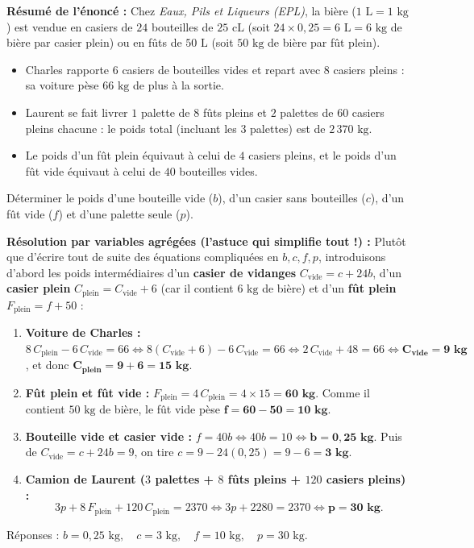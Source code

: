 \begin{exemple}
\textbf{Résumé de l'énoncé :} Chez \emph{Eaux, Pils et Liqueurs (EPL)}, la bière ($1\text{ L} = 1\text{ kg}$) est vendue en casiers de $24$ bouteilles de $25\text{ cL}$ (soit $24 \times 0,25 = 6\text{ L} = 6\text{ kg}$ de bière par casier plein) ou en fûts de $50\text{ L}$ (soit $50\text{ kg}$ de bière par fût plein).
\begin{itemize}
    \item Charles rapporte $6$ casiers de bouteilles vides et repart avec $8$ casiers pleins : sa voiture pèse $66\text{ kg}$ de plus à la sortie.
    \item Laurent se fait livrer $1$ palette de $8$ fûts pleins et $2$ palettes de $60$ casiers pleins chacune : le poids total (incluant les $3$ palettes) est de $2\,370\text{ kg}$.
    \item Le poids d'un fût plein équivaut à celui de $4$ casiers pleins, et le poids d'un fût vide équivaut à celui de $40$ bouteilles vides.
\end{itemize}
Déterminer le poids d'une bouteille vide ($b$), d'un casier sans bouteilles ($c$), d'un fût vide ($f$) et d'une palette seule ($p$).

\textbf{Résolution par variables agrégées (l'astuce qui simplifie tout !) :}
Plutôt que d'écrire tout de suite des équations compliquées en $b, c, f, p$, introduisons d'abord les poids intermédiaires d'un \textbf{casier de vidanges} $C_{\text{vide}} = c + 24b$, d'un \textbf{casier plein} $C_{\text{plein}} = C_{\text{vide}} + 6$ (car il contient $6\text{ kg}$ de bière) et d'un \textbf{fût plein} $F_{\text{plein}} = f + 50$ :
\begin{enumerate}
    \item \textbf{Voiture de Charles :} $8\,C_{\text{plein}} - 6\,C_{\text{vide}} = 66 \iff 8(C_{\text{vide}} + 6) - 6\,C_{\text{vide}} = 66 \iff 2\,C_{\text{vide}} + 48 = 66 \iff \mathbf{C_{\text{vide}} = 9\text{ kg}}$, et donc $\mathbf{C_{\text{plein}} = 9 + 6 = 15\text{ kg}}$.
    \item \textbf{Fût plein et fût vide :} $F_{\text{plein}} = 4\,C_{\text{plein}} = 4 \times 15 = \mathbf{60\text{ kg}}$. Comme il contient $50\text{ kg}$ de bière, le fût vide pèse $\mathbf{f = 60 - 50 = 10\text{ kg}}$.
    \item \textbf{Bouteille vide et casier vide :} $f = 40b \iff 40b = 10 \iff \mathbf{b = 0,25\text{ kg}}$. Puis de $C_{\text{vide}} = c + 24b = 9$, on tire $c = 9 - 24(0,25) = 9 - 6 = \mathbf{3\text{ kg}}$.
    \item \textbf{Camion de Laurent ($3$ palettes + $8$ fûts pleins + $120$ casiers pleins) :}
    \[
        3p + 8\,F_{\text{plein}} + 120\,C_{\text{plein}} = 2370 \iff 3p + 2280 = 2370 \iff \mathbf{p = 30\text{ kg}}.
    \]
\end{enumerate}
Réponses : $\boxed{b = 0,25\text{ kg},\quad c = 3\text{ kg},\quad f = 10\text{ kg},\quad p = 30\text{ kg}}$.
\end{exemple}

